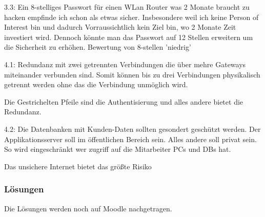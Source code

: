 \documentclass[a4paper]{article}
\begin{document}
3.3: Ein 8-stelliges Passwort für einen WLan Router was 2 Monate braucht zu hacken empfinde ich schon als etwas sicher. Insbesondere weil ich keine Person of Interest bin und dadurch Vorraussichtlich kein Ziel bin, wo 2 Monate Zeit investiert wird. Dennoch könnte man das Passwort auf 12 Stellen erweitern um die Sicherheit zu erhöhen. Bewertung von 8-stellen 'niedrig'

4.1: Redundanz mit zwei getrennten Verbindungen die über mehre Gateways miteinander verbunden sind. Somit können bis zu drei Verbindungen physikalisch getrennt werden ohne das die Verbindung unmöglich wird.

Die Gestrichelten Pfeile sind die Authentisierung und alles andere bietet die Redundanz.

4.2: Die Datenbanken mit Kunden-Daten sollten gesondert geschützt werden. Der Applikationsserver soll im öffentlichen Bereich sein. Alles andere soll privat sein. So wird eingeschränkt wer zugriff auf die Mitarbeiter PCs und DBs hat.

Das unsichere Internet bietet das größte Risiko

\subsubsection{Lösungen}

Die Lösungen werden noch auf Moodle nachgetragen.
\end{document}
